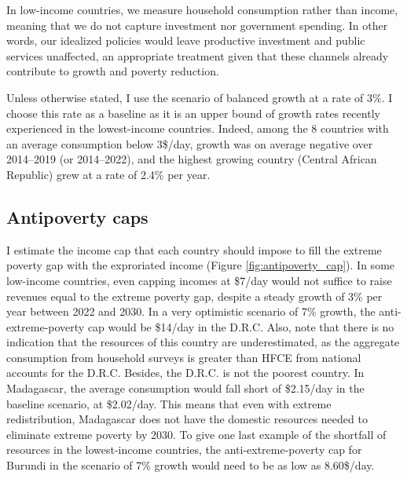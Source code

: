 In low-income countries, we measure household consumption rather than income, meaning that we do not capture investment nor government spending. In other words, our idealized policies would leave productive investment and public services unaffected, an appropriate treatment given that these channels already contribute to growth and poverty reduction.%

Unless otherwise stated, I use the scenario of balanced growth at a rate of 3\%. I choose this rate as a baseline as it is an upper bound of growth rates recently experienced in the lowest-income countries. Indeed, among the 8 countries with an average consumption below 3\$/day, growth was on average negative over 2014--2019 (or 2014--2022), and the highest growing country (Central African Republic) grew at a rate of 2.4\% per year. %

\subsection{Antipoverty caps}

I estimate the income cap that each country should impose to fill the extreme poverty gap with the exproriated income (Figure \ref{fig:antipoverty_cap}). 
In some low-income countries, even capping incomes at \$7/day would not suffice to raise revenues equal to the extreme poverty gap, despite a steady growth of 3\% per year between 2022 and 2030. 
In a very optimistic scenario of 7\% growth, the anti-extreme-poverty cap would be \$14/day in the D.R.C. Also, note that there is no indication that the resources of this country are underestimated, as the aggregate consumption from household surveys is greater than HFCE %
from national accounts for the D.R.C. 
Besides, the D.R.C. is not the poorest country. 
In Madagascar, the average consumption would fall short of \$2.15/day in the baseline scenario, at \$2.02/day. This means that even with extreme redistribution, Madagascar does not have the domestic resources needed to eliminate extreme poverty by 2030. 
To give one last example of the shortfall of resources in the lowest-income countries, the anti-extreme-poverty cap for Burundi in the scenario of 7\% growth would need to be as low as 8.60\$/day. 

